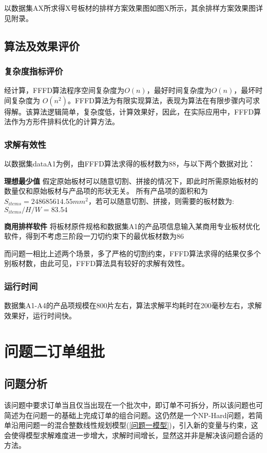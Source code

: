 \documentclass[bwprint]{gmcmthesis}
\begin{document}
	以数据集AX所求得X号板材的排样方案效果图如图X所示，其余排样方案效果图详见附录。
	
\subsection{算法及效果评价}

\subsubsection{复杂度指标评价}  

经计算，FFFD算法程序空间复杂度为$O(n)$，最好时间复杂度为$O(n)$，最坏时间复杂度为 $ O(n^2) $。FFFD算法为有限实现算法，表现为算法在有限步骤内可求得解。该算法逻辑简单，复杂度低，计算效果好，因此，在实际应用中，FFFD算法作为方形件排料优化的计算方法。


\subsubsection{求解有效性}
	
	以数据集dataA1为例，由FFFD算法求得的板材数为88，与以下两个数据对比：
	
	\textbf{理想最少值} \quad 假定原始板材可以随意切割、拼接的情况下，即此时所需原始板材的数量仅和原始板材与产品项的形状无关。 所有产品项的面积和为 $ S_{items} = 248685614.55 mm^2 $，若可以随意切割、拼接，则需要的板材数为: $ S_{items}/H/W =  83.54 $
	
	\textbf{商用排样软件} \quad 将板材原件规格和数据集A1的产品项信息输入某商用专业板材优化软件，得到不考虑三阶段一刀切约束下的最优板材数为86
	
	而问题一相比上述两个场景，多了严格的切割约束，FFFD算法求得的结果仅多个别板材数，由此可见，FFFD算法具有较好的求解有效性。

	
\subsubsection{运行时间}
	 
	数据集A1-A4的产品项规模在800片左右，算法求解平均耗时在200毫秒左右，求解效果好，运行时间快。
		


\section{问题二订单组批}

\subsection{问题分析}
该问题中要求订单当且仅当出现在一个批次中，即订单不可拆分，所以该问题也可简述为在问题一的基础上完成订单的组合问题。这仍然是一个NP-Hard问题，若简单沿用问题一的混合整数线性规划模型(\ref{问题一模型})，引入新的变量与约束，这会使得模型求解难度进一步增大，求解时间增长，显然这并非是解决该问题合适的方法。
\end{document}
